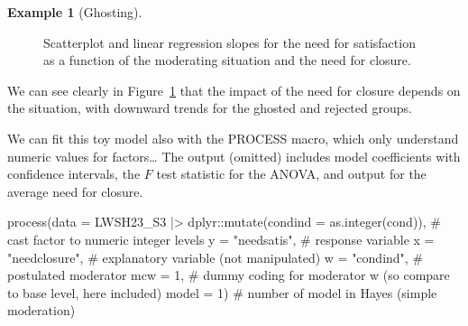 \documentclass[
  11pt,
  letterpaper,
]{scrbook}
\newenvironment{Shaded}{\begin{snugshade}}{\end{snugshade}}
\newcommand{\AttributeTok}[1]{\textcolor[rgb]{0.40,0.45,0.13}{#1}}
\newcommand{\CommentTok}[1]{\textcolor[rgb]{0.37,0.37,0.37}{#1}}
\newcommand{\DecValTok}[1]{\textcolor[rgb]{0.68,0.00,0.00}{#1}}
\newcommand{\FunctionTok}[1]{\textcolor[rgb]{0.28,0.35,0.67}{#1}}
\newcommand{\NormalTok}[1]{\textcolor[rgb]{0.00,0.23,0.31}{#1}}
\newcommand{\SpecialCharTok}[1]{\textcolor[rgb]{0.37,0.37,0.37}{#1}}
\newcommand{\StringTok}[1]{\textcolor[rgb]{0.13,0.47,0.30}{#1}}
\theoremstyle{definition}
\newtheorem{example}{Example}[chapter]
\theoremstyle{definition}
\theoremstyle{remark}
\begin{document}
\begin{example}[Ghosting]
\begin{figure}[ht!]
{}

\caption{\label{fig-moderation2-slopes}Scatterplot and linear regression
slopes for the need for satisfaction as a function of the moderating
situation and the need for closure.}

\end{figure}%

We can see clearly in Figure~\ref{fig-moderation2-slopes} that the
impact of the need for closure depends on the situation, with downward
trends for the ghosted and rejected groups.

We can fit this toy model also with the PROCESS macro, which only
understand numeric values for factors\ldots{} The output (omitted)
includes model coefficients with confidence intervals, the \(F\) test
statistic for the ANOVA, and output for the average need for closure.

\begin{Shaded}
\begin{Highlighting}[]
\FunctionTok{process}\NormalTok{(}\AttributeTok{data =}\NormalTok{ LWSH23\_S3 }\SpecialCharTok{|\textgreater{}}
\NormalTok{          dplyr}\SpecialCharTok{::}\FunctionTok{mutate}\NormalTok{(}\AttributeTok{condind =} \FunctionTok{as.integer}\NormalTok{(cond)), }\CommentTok{\# cast factor to numeric integer levels}
        \AttributeTok{y =} \StringTok{"needsatis"}\NormalTok{,  }\CommentTok{\# response variable}
        \AttributeTok{x =} \StringTok{"needclosure"}\NormalTok{, }\CommentTok{\# explanatory variable (not manipulated)}
        \AttributeTok{w =} \StringTok{"condind"}\NormalTok{, }\CommentTok{\# postulated moderator}
        \AttributeTok{mcw =} \DecValTok{1}\NormalTok{, }\CommentTok{\# dummy coding for moderator w (so compare to base level, here \textquotesingle{}included\textquotesingle{})}
        \AttributeTok{model =} \DecValTok{1}\NormalTok{) }\CommentTok{\# number of model in Hayes (simple moderation)}
\end{Highlighting}
\end{Shaded}

\end{example}
\end{document}
